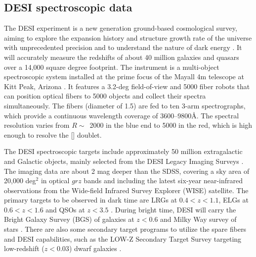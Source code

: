 \documentclass[twocolumn]{aastex631}
\newcommand{\OII}{[\mbox{\ion{O}{2}}]}    %
\newcommand{\boldtext}[1]{\textcolor[rgb]{0,0,0}{#1}}
\begin{document}
\subsection{DESI spectroscopic data}

The DESI experiment is a \boldtext{new generation ground-based} cosmological survey, aiming to explore the expansion history and structure growth rate of the universe with unprecedented precision and to understand the nature of dark energy \citep{Lev13,Des16a,Des16b,Des23a,Des23b}.  It will accurately measure the redshifts of about 40 million galaxies and quasars over a 14,000 square degree footprint. The instrument is a multi-object spectroscopic system installed at the prime focus of the Mayall 4m telescope at Kitt Peak, Arizona \citep{Des22,Sil23,Mil23}. It features a 3.2-deg field-of-view and 5000 fiber robots that can position optical fibers to 5000 objects and collect their spectra simultaneously. The fibers (diameter of 1.5\arcsec) are fed to ten 3-arm spectrographs, which provide a continuous wavelength coverage of 3600--9800\AA.  The spectral resolution varies from $R\sim$~2000 in the blue end to 5000 in the red, which is high enough to resolve the {\OII} doublet. 
 
The DESI spectroscopic targets include approximately 50 million extragalactic and Galactic objects, mainly selected from the DESI Legacy Imaging Surveys \citep{Zou17, Dey19, Sch23}. The imaging data are about 2 mag deeper than the SDSS, covering a sky area of 20,000 deg$^2$ in optical $grz$ bands and including the latest six-year near-infrared observations from the Wide-field Infrared Survey Explorer (WISE) satellite. The primary targets to be observed in dark time are LRGs at $0.4<z<1.1$, ELGs at $0.6<z<1.6$ and QSOs at $z<3.5$ \citep{Rai20,Rui20,Yec20,Zho20,Cha23,Zho23,Rai23b}. During bright time, DESI will carry the Bright Galaxy Survey (BGS) of galaxies at $z<0.6$ and Milky Way survey of stars \citep{All20,Rui20,Coo22,Hah23}. There are also some secondary target programs to utilize the spare fibers and DESI capabilities, such as the LOW-Z Secondary Target Survey targeting low-redshift ($z<0.03$) dwarf galaxies \citep{Dar22}.
\end{document}
